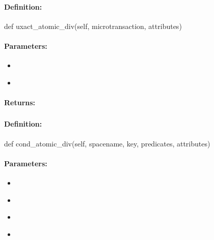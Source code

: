 \paragraph{Definition:}
\begin{pythoncode}
def uxact_atomic_div(self, microtransaction, attributes)
\end{pythoncode}

\paragraph{Parameters:}
\begin{itemize}[noitemsep]
\item {}\\

\item {}\\

\end{itemize}

\paragraph{Returns:}


\pagebreak
\subsubsection{}
\label{api:python:cond_atomic_div}


\paragraph{Definition:}
\begin{pythoncode}
def cond_atomic_div(self, spacename, key, predicates, attributes)
\end{pythoncode}

\paragraph{Parameters:}
\begin{itemize}[noitemsep]
\item {}\\

\item {}\\

\item {}\\

\item {}\\

\end{itemize}

